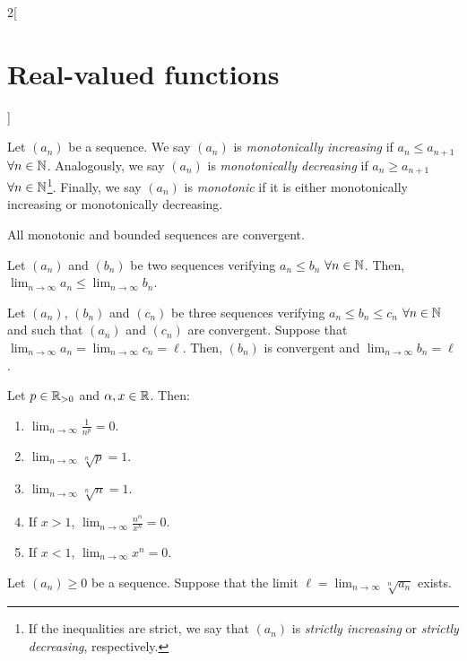 \documentclass[../../../main.tex]{subfiles}
\begin{document}
\begin{multicols}{2}[\section{Real-valued functions}]
\begin{lemma}
\begin{enumerate}
    \end{enumerate}
  \end{lemma}
  \begin{definition}
    Let $(a_n)$ be a sequence. We say $(a_n)$ is \emph{monotonically increasing} if $a_n\leq a_{n+1}$ $\forall n\in\mathbb{N}$. Analogously, we say $(a_n)$ is \emph{monotonically decreasing} if $a_n\geq a_{n+1}$ $\forall n\in\mathbb{N}$\footnote{If the inequalities are strict, we say that $(a_n)$ is \emph{strictly increasing} or \emph{strictly decreasing}, respectively.}. Finally, we say $(a_n)$ is \emph{monotonic} if it is either monotonically increasing or monotonically decreasing.
  \end{definition}
  \begin{theorem}
    All monotonic and bounded sequences are convergent.
  \end{theorem}
  \begin{lemma}
    Let $(a_n)$ and $(b_n)$ be two sequences verifying $a_n\leq b_n$ $\forall n\in\mathbb{N}$. Then, $\displaystyle\lim_{n\to\infty} a_n\leq\lim_{n\to\infty} b_n$.
  \end{lemma}
  \begin{proposition}
    Let $(a_n)$, $(b_n)$ and $(c_n)$ be three sequences verifying $a_n\leq b_n\leq c_n$ $\forall n\in\mathbb{N}$ and such that $(a_n)$ and $(c_n)$ are convergent. Suppose that $\displaystyle\lim_{n\to\infty} a_n=\lim_{n\to\infty} c_n=\ell$. Then, $(b_n)$ is convergent and $\displaystyle\lim_{n\to\infty} b_n=\ell$.
  \end{proposition}
  \begin{lemma}
    Let $p\in\mathbb{R}_{>0}$ and $\alpha,x\in\mathbb{R}$. Then:
    \begin{enumerate}
      \item $\displaystyle\lim_{n\to\infty}\frac{1}{n^p}=0$.
      \item $\displaystyle\lim_{n\to\infty}\sqrt[n]{p}=1$.
      \item $\displaystyle\lim_{n\to\infty}\sqrt[n]{n}=1$.
      \item If $x>1$, $\displaystyle\lim_{n\to\infty}\frac{n^\alpha}{x^n}=0$.
      \item If $x<1$, $\displaystyle\lim_{n\to\infty} x^n=0$.
    \end{enumerate}
  \end{lemma}
  \begin{theorem}
    Let $(a_n)\geq 0$ be a sequence. Suppose that the limit $\displaystyle \ell=\lim_{n\to\infty}\sqrt[n]{a_n}$ exists.
    \begin{enumerate}

\end{enumerate}
\end{theorem}
\end{multicols}
\end{document}
